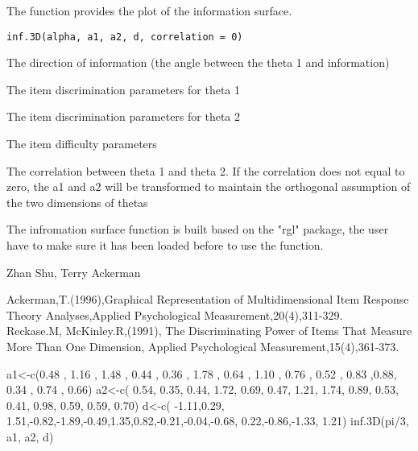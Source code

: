 \begin{Description}\relax
The function provides the plot of the information surface.
\end{Description}
\begin{Usage}
\begin{verbatim}
inf.3D(alpha, a1, a2, d, correlation = 0)
\end{verbatim}
\end{Usage}
\begin{Arguments}
\begin{ldescription}
\item[\code{alpha}] The direction of information (the angle between the theta 1 and information) 
\item[\code{a1}] The item discrimination parameters for theta 1 
\item[\code{a2}] The item discrimination parameters for theta 2 
\item[\code{d}] The item difficulty parameters
\item[\code{correlation}] The correlation between theta 1 and theta 2. If the correlation does not equal to zero, the a1 and a2 will be transformed to maintain the orthogonal assumption of the two dimensions of thetas  
\end{ldescription}
\end{Arguments}
\begin{Details}\relax
The infromation surface function is built based on the "rgl" package, the user have to make sure it has been loaded before to use the function.
\end{Details}
\begin{Author}\relax
Zhan Shu, Terry Ackerman
\end{Author}
\begin{References}\relax
Ackerman,T.(1996),Graphical Representation of Multidimensional Item Response Theory Analyses,Applied Psychological Measurement,20(4),311-329.\\
Reckase.M, McKinley.R,(1991), The Discriminating Power of Items That Measure More Than One Dimension, Applied Psychological Measurement,15(4),361-373.
\end{References}
\begin{Examples}
\begin{ExampleCode}
a1<-c(0.48 , 1.16 , 1.48 , 0.44 , 0.36 , 1.78 , 0.64 , 1.10 , 0.76 , 0.52 , 0.83 ,0.88, 0.34 , 0.74 , 0.66)
a2<-c( 0.54, 0.35, 0.44, 1.72, 0.69, 0.47, 1.21, 1.74, 0.89, 0.53, 0.41, 0.98, 0.59, 0.59, 0.70)
d<-c( -1.11,0.29, 1.51,-0.82,-1.89,-0.49,1.35,0.82,-0.21,-0.04,-0.68, 0.22,-0.86,-1.33, 1.21)
inf.3D(pi/3, a1, a2, d)
\end{ExampleCode}
\end{Examples}

